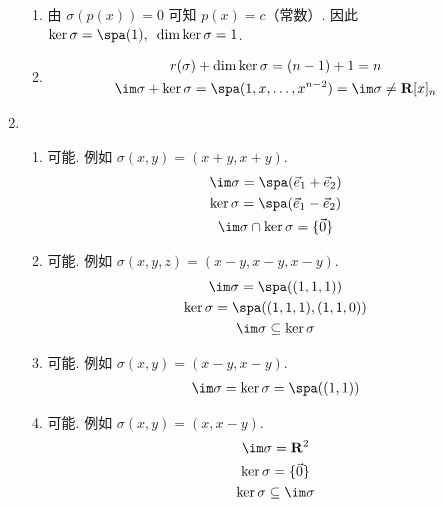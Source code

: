 \begin{enumerate}
\begin{enumerate}
        \item 由 $ \sigma(p(x)) = 0 $ 可知 $ p(x) = c $（常数）. 因此 $ \ker \sigma = \spa(1),\enspace \dim \ker \sigma = 1 $.

        \item \begin{gather*}
                  r(\sigma) + \dim \ker \sigma = (n - 1) + 1 = n \\
                  \im \sigma + \ker \sigma = \spa(1, x, \ldots, x^{n - 2}) = \im \sigma \neq \mathbf{R}[x]_n
              \end{gather*}
    \end{enumerate}

    \item \begin{enumerate}
        \item 可能. 例如 $ \sigma(x, y) = (x + y, x + y) $.
              \begin{gather*}
                  \im \sigma = \spa(\vec{e}_1 + \vec{e}_2) \\
                  \ker \sigma = \spa(\vec{e}_1 - \vec{e}_2) \\
                  \im \sigma \cap \ker \sigma = \{\vec{0}\}
              \end{gather*}

        \item 可能. 例如 $ \sigma(x, y, z) = (x - y, x - y, x - y) $.
              \begin{gather*}
                  \im \sigma = \spa((1, 1, 1)) \\
                  \ker \sigma = \spa((1, 1, 1), (1, 1, 0)) \\
                  \im \sigma \subseteq \ker \sigma
              \end{gather*}

        \item 可能. 例如 $ \sigma(x, y) = (x - y, x - y) $.
              \begin{gather*}
                  \im \sigma = \ker \sigma = \spa((1, 1))
              \end{gather*}

        \item 可能. 例如 $ \sigma(x, y) = (x, x - y) $.
              \begin{gather*}
                  \im \sigma = \mathbf{R}^2 \\
                  \ker \sigma = \{\vec{0}\} \\
                  \ker \sigma \subseteq \im \sigma
              \end{gather*}
    \end{enumerate}


\end{enumerate}
